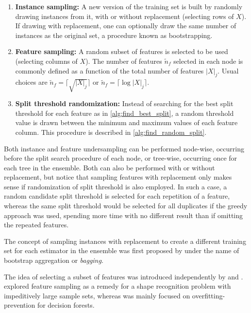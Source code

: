 \begin{enumerate}  %
    \item \textbf{Instance sampling:} A new version of the training set is built by randomly drawing instances from it, with or without replacement (selecting rows of $X$). If drawing with replacement, one can optionally draw the same number of instances as the original set, a procedure known as bootstrapping.
    \item \textbf{Feature sampling:} A random subset of features is selected to be used (selecting columns of $X$). The number of features $\tilde n_f$ selected in each node is commonly defined as a function of the total number of features $|X|_j$. Usual choices are $\tilde n_f = \lceil \sqrt{|X|_j} \rceil$ or $\tilde n_f = \lceil \log |X|_j \rceil$.
    \item \textbf{Split threshold randomization:} Instead of searching for the best split threshold for each feature as in \autoref{alg:find_best_split}, a random threshold value is drawn between the minimum and maximum values of each feature column. This procedure is described in \autoref{alg:find_random_split}.  %
\end{enumerate}

Both instance and feature undersampling can be performed node-wise, occurring before the split search procedure of each node, or tree-wise, occurring once for each tree in the ensemble. Both can also be performed with or without replacement, but notice that sampling features with replacement only makes sense if randomization of split threshold is also employed. In such a case, a random candidate split threshold is selected for each repetition of a feature, whereas the same split threshold would be selected for all duplicates if the greedy approach was used, spending more time with no different result than if omitting the repeated features.

The concept of sampling instances with replacement to create a different training set for each estimator in the ensemble was first proposed by  under the name of bootstrap aggregation or \emph{bagging}.

The idea of selecting a subset of features was introduced independently by  and .  explored feature sampling as a remedy for a shape recognition problem with impeditively large sample sets, whereas  was mainly focused on overfitting-prevention for decision forests.


